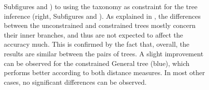 \begin{figure}[hpbt]
{        Subfigures  and ) to
        using the  taxonomy as constraint for the tree inference (right, Subfigures
         and ).
        As explained in ,
        the differences between the unconstrained and constrained trees mostly concern their inner branches,
        and thus are not expected to affect the accuracy much.
        This is confirmed by the fact that, overall, the results are similar between the pairs of trees.
        A slight improvement can be observed for the constrained General tree (blue),
        which performs better according to both distance measures.
        In most other cases, no significant differences can be observed.
    }
    \label{fig:constraints_backbone}
\end{figure}

